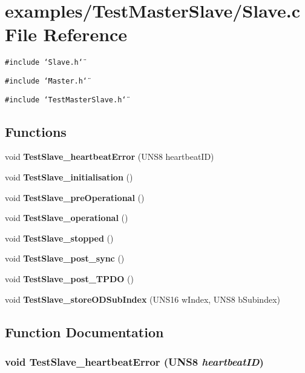 \section{examples/Test\-Master\-Slave/Slave.c File Reference}
\label{Slave_8c}
{\tt \#include \char`\"{}Slave.h\char`\"{}}\par
{\tt \#include \char`\"{}Master.h\char`\"{}}\par
{\tt \#include \char`\"{}Test\-Master\-Slave.h\char`\"{}}\par
\subsection*{Functions}
\begin{CompactItemize}
\item 
void {\bf Test\-Slave\_\-heartbeat\-Error} (UNS8 heartbeat\-ID)
\item 
void {\bf Test\-Slave\_\-initialisation} ()
\item 
void {\bf Test\-Slave\_\-pre\-Operational} ()
\item 
void {\bf Test\-Slave\_\-operational} ()
\item 
void {\bf Test\-Slave\_\-stopped} ()
\item 
void {\bf Test\-Slave\_\-post\_\-sync} ()
\item 
void {\bf Test\-Slave\_\-post\_\-TPDO} ()
\item 
void {\bf Test\-Slave\_\-store\-ODSub\-Index} (UNS16 w\-Index, UNS8 b\-Subindex)
\end{CompactItemize}


\subsection{Function Documentation}
\subsubsection{\setlength{\rightskip}{0pt plus 5cm}void Test\-Slave\_\-heartbeat\-Error (UNS8 {\em heartbeat\-ID})}\label{Slave_8c_da03f81a4976684fe32771da3024e487}


